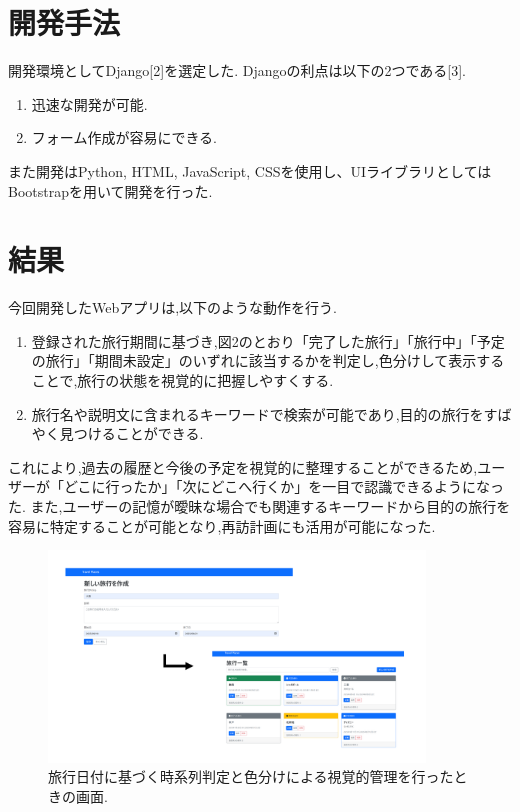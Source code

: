\documentclass[a4j,twocolumn]{jsarticle}
\begin{document}
\section{開発手法}
\label{sec:org0c9682a}
開発環境としてDjango[2]を選定した.
Djangoの利点は以下の2つである[3].
\begin{enumerate}
\item 迅速な開発が可能.
\item フォーム作成が容易にできる.
\end{enumerate}
また開発はPython, HTML, JavaScript, CSSを使用し、UIライブラリとしてはBootstrapを用いて開発を行った.


\section{結果}
\label{sec:org13ce1ab}
今回開発したWebアプリは,以下のような動作を行う.

\begin{enumerate}
\item 登録された旅行期間に基づき,図2のとおり「完了した旅行」「旅行中」「予定の旅行」「期間未設定」のいずれに該当するかを判定し,色分けして表示することで,旅行の状態を視覚的に把握しやすくする.
\item 旅行名や説明文に含まれるキーワードで検索が可能であり,目的の旅行をすばやく見つけることができる.
\end{enumerate}
これにより,過去の履歴と今後の予定を視覚的に整理することができるため,ユーザーが「どこに行ったか」「次にどこへ行くか」を一目で認識できるようになった.
また,ユーザーの記憶が曖昧な場合でも関連するキーワードから目的の旅行を容易に特定することが可能となり,再訪計画にも活用が可能になった.

\begin{figure}[htbp]
\centering
\includegraphics[width=10cm]{./figs/trip1.png}
\caption{\label{fig:org9f17108}旅行日付に基づく時系列判定と色分けによる視覚的管理を行ったときの画面.}
\end{figure}
\end{document}
